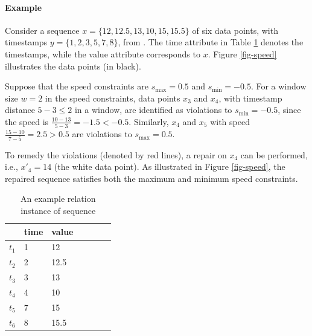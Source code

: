 \documentclass{article}
\begin{document}
\paragraph{Example}


Consider a sequence $\mathit{x} = \{12, 12.5, 13, 10, 15, 15.5\}$ of six data points, with timestamps $\mathit{y} = \{1,2,3,5,7,8\}$, from  \cite{DBLP:conf/sigmod/SongZWY15}. 
The \textsf{time} attribute in Table \ref{table-example-speed} denotes the timestamps, while the \textsf{value} attribute corresponds to $\mathit{x}$.
Figure \ref{fig-speed} illustrates the data points (in black). 

Suppose that the speed constraints are $\mathit{s}_{\max} = 0.5$ and $\mathit{s}_{\min} = -0.5$.
For a window size $\mathit{w} = 2$ in the speed constraints,  data points $\mathit{x}_3$ and $\mathit{x}_4$, with timestamp distance $5-3\leq 2$ in a window, are identified as violations to $\mathit{s}_{\min} = -0.5$, since the speed is
$\frac{10-13}{5-3}=-1.5<-0.5$.
Similarly, $\mathit{x}_4$ and $\mathit{x}_5$ with speed 
$\frac{15-10}{7-5}=2.5>0.5$ are violations to $\mathit{s}_{\max} = 0.5$.

To remedy the violations (denoted by red lines), a repair on $\mathit{x}_4$ can be performed, i.e., $\mathit{x}'_4=14$ (the white data point). 
As illustrated in Figure \ref{fig-speed}, the repaired sequence satisfies both the maximum and minimum speed constraints.


 \begin{table}
 \centering\small
 \caption{An example relation instance of sequence} 
 \label{table-example-speed}
 \begin{tabular}{lllllll}
 \toprule
 & \textsf{time} & \textsf{value} \\ 
 \midrule
 $t_1$ & 1 & 12 \\
 $t_2$ & 2 & 12.5 \\
 $t_3$ & 3 & 13 \\
 $t_4$ & 4 & 10 \\
 $t_5$ & 7 & 15 \\
 $t_6$ & 8 & 15.5 \\
 \bottomrule
 \end{tabular}
 \end{table}
\end{document}
